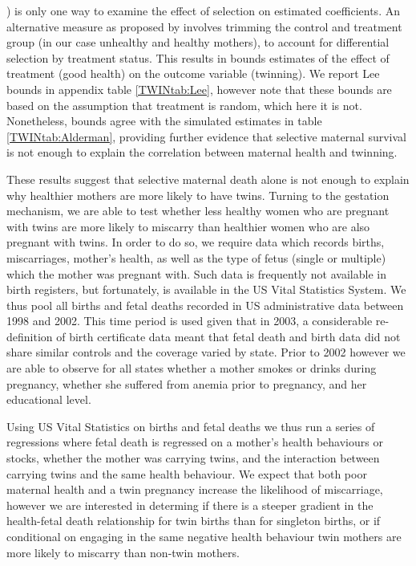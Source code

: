 \documentclass[subeqn]{article}
\begin{document}
\begin{spacing}{1.4}
{  \citet{Aldermanetal2011}) is only one way to examine the effect of selection
  on estimated coefficients.  An alternative measure as proposed by
  \citet{Lee2009} involves trimming the control and treatment group (in our
  case unhealthy and healthy mothers), to account for differential selection
  by treatment status.  This results in bounds estimates of the effect of
  treatment (good health) on the outcome variable (twinning). We report Lee
  bounds in appendix table \ref{TWINtab:Lee}, however note that these bounds
  are based on the assumption that treatment is random, which here it is not.
  Nonetheless, \citet{Lee2009} bounds agree with the simulated estimates in
  table \ref{TWINtab:Alderman}, providing further evidence that selective
  maternal survival is not enough to explain the correlation between maternal
  health and twinning.}

These results suggest that selective maternal death alone is not enough to 
explain why healthier mothers are more likely to have twins. Turning to the 
gestation mechanism, we are able to test whether less healthy women who are 
pregnant with twins are more likely to miscarry than healthier women who are 
also pregnant with twins.  In order to do so, we require data which records
births, miscarriages, mother's health, as well as the type of fetus (single
or multiple) which the mother was pregnant with.  Such data is frequently not
available in birth registers, but fortunately, is available in the US Vital
Statistics System.  We thus pool all births and fetal deaths recorded in US
administrative data between 1998 and 2002.  This time period is used given
that in 2003, a considerable re-definition of birth certificate data meant
that fetal death and birth data did not share similar controls and the coverage
varied by state.  Prior to 2002 however we are able to observe for all states
whether a mother smokes or drinks during pregnancy, whether she suffered from
anemia prior to pregnancy, and her educational level.

Using US Vital Statistics on births and fetal deaths we thus run a series of
regressions where fetal death is regressed on a mother's health behaviours or
stocks, whether the mother was carrying twins, and the interaction between
carrying twins and the same health behaviour.  We expect that both poor
maternal health and a twin pregnancy increase the likelihood of miscarriage,
however we are interested in determing if there is a steeper gradient in the
health-fetal death relationship for twin births than for singleton births, or
if conditional on engaging in the same negative health behaviour twin mothers
are more likely to miscarry than non-twin mothers.


\end{spacing}
\end{document}
